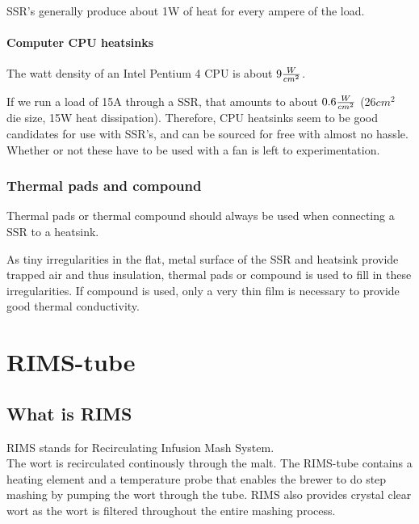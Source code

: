 \documentclass[11pt,fleqn,openany]{book} %
\begin{document}
SSR's generally produce about 1W of heat for every ampere of the load.

\subsubsection{Computer CPU heatsinks}

The watt density of an Intel Pentium 4 CPU is about $9 {W \over {cm^2}}$.

If we run a load of 15A through a SSR, that amounts to about $0.6 {W \over {cm^2}}$ (26$cm^2$ die size, 15W heat dissipation). Therefore, CPU heatsinks seem to be good candidates for use with SSR's, and can be sourced for free with almost no hassle. Whether or not these have to be used with a fan is left to experimentation.

\subsection{Thermal pads and compound}

Thermal pads or thermal compound should always be used when connecting a SSR to a heatsink.

As tiny irregularities in the flat, metal surface of the SSR and heatsink provide trapped air and thus insulation, thermal pads or compound is used to fill in these irregularities. If compound is used, only a very thin film is necessary to provide good thermal conductivity.



\chapter{RIMS-tube}

\section{What is RIMS}

RIMS stands for Recirculating Infusion Mash System.\\
The wort is recirculated continously through the malt. The RIMS-tube contains a heating element and a temperature probe that enables the brewer to do step mashing by pumping the wort through the tube. RIMS also provides crystal clear wort as the wort is filtered throughout the entire mashing process.
\end{document}
